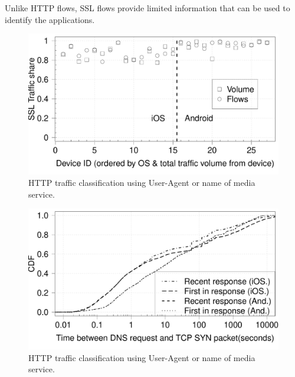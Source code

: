 Unlike HTTP flows, SSL flows provide limited information that can be used to identify the applications. 



\cite{chen:wifi}



\begin{figure}
\includegraphics[width=\columnwidth]{plots/sslanalysis_samedns_traffic.pdf}
\caption{HTTP traffic classification using User-Agent or name of media service.}
\label{fig:http-classification-app-service}
\end{figure}


\begin{figure}
\includegraphics[width=\columnwidth]{plots/sslanalysis_dns_timediff_distrib.pdf}
\caption{HTTP traffic classification using User-Agent or name of media service.}
\label{fig:http-classification-app-service}
\end{figure}



